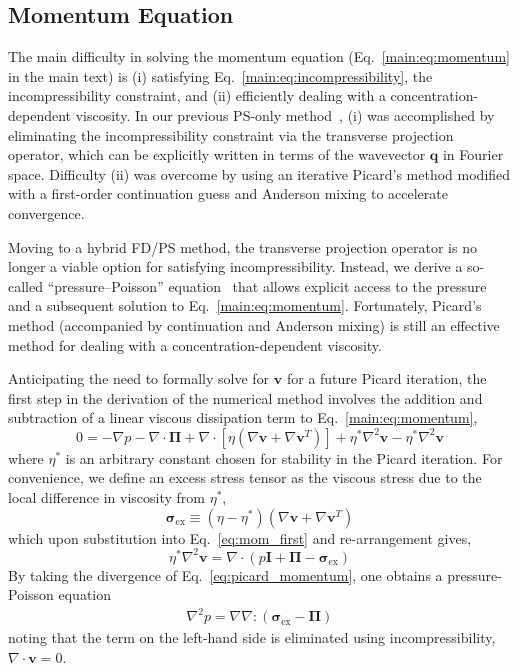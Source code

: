 \documentclass[journal=mamobx,manuscript=suppinfo]{achemso}
\newcommand{\ex}{\mathrm{ex}}
\begin{document}
\subsection{Momentum Equation}
The main difficulty in solving the momentum equation (Eq.~\ref{main:eq:momentum} in the main text) is (i) satisfying Eq.~\ref{main:eq:incompressibility}, the incompressibility constraint, and (ii) efficiently dealing with a concentration-dependent viscosity.
In our previous PS-only method~\cite{Tree2017}, (i) was accomplished by eliminating the incompressibility constraint via the transverse projection operator, which can be explicitly written in terms of the wavevector $\bm{q}$ in Fourier space.
Difficulty (ii) was overcome by using an iterative Picard's method modified with a first-order continuation guess and Anderson mixing to accelerate convergence.

Moving to a hybrid FD/PS method, the transverse projection operator is no longer a viable option for satisfying incompressibility.
Instead, we derive a so-called ``pressure--Poisson'' equation~\cite{Rempfer2006} that allows explicit access to the pressure and a subsequent solution to Eq.~\ref{main:eq:momentum}.
Fortunately, Picard's method (accompanied by continuation and Anderson mixing) is still an effective method for dealing with a concentration-dependent viscosity.

Anticipating the need to formally solve for $\bm{v}$ for a future Picard iteration, the first step in the derivation of the numerical method involves the addition and subtraction of a linear viscous dissipation term to Eq.~\ref{main:eq:momentum},
\begin{equation} \label{eq:mom_first}
  0 = -\nabla p - \nabla \cdot \bm{\Pi} + 
    \nabla \cdot \left [ \eta (\nabla \bm{v} + \nabla \bm{v}^{T}) \right ] 
    + \eta^{*} \nabla^{2} \bm{v} - \eta^{*} \nabla^{2} \bm{v}
\end{equation}
where $\eta^{*}$ is an arbitrary constant\footnotemark{} chosen for stability in the Picard iteration. %
For convenience, we define an excess stress tensor as the viscous stress due to the local difference in viscosity from $\eta^{*}$,
\begin{equation} \label{eq:excess_stress}
  \bm{\sigma}_{\ex} \equiv (\eta - \eta^{*} ) (\nabla \bm{v} + \nabla \bm{v}^{T})
\end{equation}
which upon substitution into Eq.~\ref{eq:mom_first} and re-arrangement gives,
\begin{equation} \label{eq:picard_momentum}
  \eta^{*} \nabla^{2} \bm{v} = \nabla \cdot \left ( p\bm{I} + \bm{\Pi} - \bm{\sigma}_{\ex} \right )
\end{equation}
By taking the divergence of Eq.~\ref{eq:picard_momentum}, one obtains a pressure-Poisson equation
\begin{gather} \label{eq:pressure_poisson}
  \nabla^{2} p = \nabla \nabla : \left ( \bm{\sigma}_{\ex} - \bm{\Pi} \right )
\end{gather}
noting that the term on the left-hand side is eliminated using incompressibility, $\nabla \cdot \bm{v} = 0$.
\end{document}
